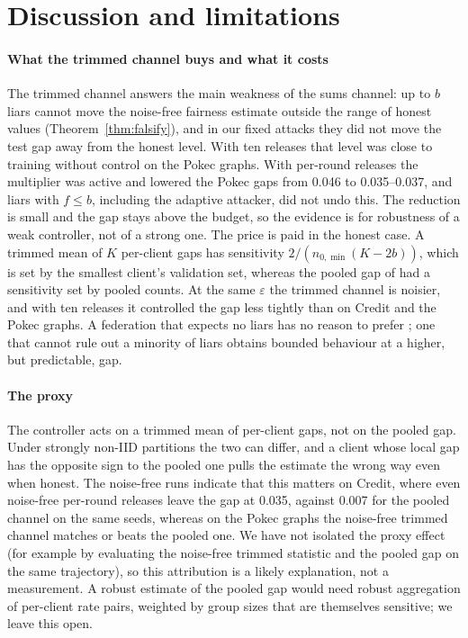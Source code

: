 \section{Discussion and limitations}\label{sec:discussion}

\paragraph{What the trimmed channel buys and what it costs}
The trimmed channel answers the main weakness of the sums channel: up to $b$ liars cannot move the noise-free fairness estimate outside the range of honest values (Theorem~\ref{thm:falsify}), and in our fixed attacks they did not move the test gap away from the honest level. With ten releases that level was close to training without control on the Pokec graphs. With per-round releases the multiplier was active and lowered the Pokec gaps from 0.046 to 0.035--0.037, and liars with $f\le b$, including the adaptive attacker, did not undo this. The reduction is small and the gap stays above the budget, so the evidence is for robustness of a weak controller, not of a strong one. The price is paid in the honest case. A trimmed mean of $K$ per-client gaps has sensitivity $2/(n_{0,\min}(K-2b))$, which is set by the smallest client's validation set, whereas the pooled gap of \clamp{} had a sensitivity set by pooled counts. At the same $\varepsilon$ the trimmed channel is noisier, and with ten releases it controlled the gap less tightly than \clamp{} on Credit and the Pokec graphs. A federation that expects no liars has no reason to prefer \rt{}; one that cannot rule out a minority of liars obtains bounded behaviour at a higher, but predictable, gap.

\paragraph{The proxy}
The controller acts on a trimmed mean of per-client gaps, not on the pooled gap. Under strongly non-IID partitions the two can differ, and a client whose local gap has the opposite sign to the pooled one pulls the estimate the wrong way even when honest. The noise-free runs indicate that this matters on Credit, where even noise-free per-round releases leave the gap at 0.035, against 0.007 for the pooled channel on the same seeds, whereas on the Pokec graphs the noise-free trimmed channel matches or beats the pooled one. We have not isolated the proxy effect (for example by evaluating the noise-free trimmed statistic and the pooled gap on the same trajectory), so this attribution is a likely explanation, not a measurement. A robust estimate of the pooled gap would need robust aggregation of per-client rate pairs, weighted by group sizes that are themselves sensitive; we leave this open.

